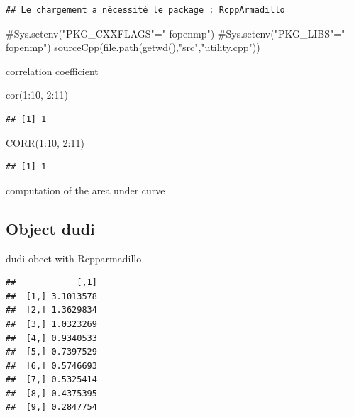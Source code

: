 \documentclass[
  10pt,
]{article}
\newenvironment{Shaded}{\begin{snugshade}}{\end{snugshade}}
\newcommand{\NormalTok}[1]{#1}
\begin{document}
\begin{verbatim}
## Le chargement a nécessité le package : RcppArmadillo
\end{verbatim}

\begin{Shaded}
\begin{Highlighting}[]
\NormalTok{\#Sys.setenv("PKG\_CXXFLAGS"="{-}fopenmp")}
\NormalTok{\#Sys.setenv("PKG\_LIBS"="{-}fopenmp")}
\NormalTok{sourceCpp(file.path(getwd(),"src","utility.cpp"))}
\end{Highlighting}
\end{Shaded}

correlation coefficient

\begin{Shaded}
\begin{Highlighting}[]
\NormalTok{cor(1:10, 2:11) }
\end{Highlighting}
\end{Shaded}

\begin{verbatim}
## [1] 1
\end{verbatim}

\begin{Shaded}
\begin{Highlighting}[]
\NormalTok{CORR(1:10, 2:11) }
\end{Highlighting}
\end{Shaded}

\begin{verbatim}
## [1] 1
\end{verbatim}

computation of the area under curve

\hypertarget{object-dudi-1}{%
\subsection{Object dudi}\label{object-dudi-1}}

dudi obect with Rcpparmadillo

\begin{Shaded}
\end{Shaded}

\begin{verbatim}
##            [,1]
##  [1,] 3.1013578
##  [2,] 1.3629834
##  [3,] 1.0323269
##  [4,] 0.9340533
##  [5,] 0.7397529
##  [6,] 0.5746693
##  [7,] 0.5325414
##  [8,] 0.4375395
##  [9,] 0.2847754
\end{verbatim}
\end{document}
